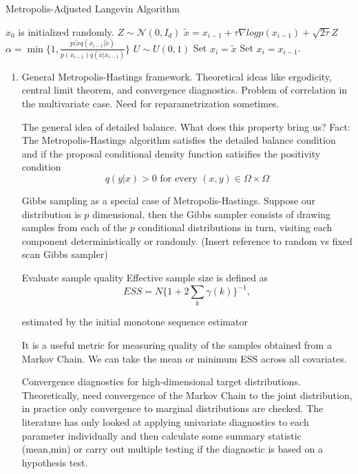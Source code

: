 \documentclass{book}
\begin{document}
\begin{algorithm}
\caption{Metropolis-Adjusted Langevin Algorithm}
\State $x_0$ is initialized randomly.
\State $Z \sim \mathcal{N}(0, I_d) $
\State $\tilde{x}= x_{i-1} + \tau \nabla log p(x_{i-1}) + \sqrt{2 \tau} Z$
\State $\alpha = \min\{1, \frac{p(\tilde{x} q(x_{i-1}|\tilde{x})}{p(x_{i-1})q(\tilde{x}|x_{i-1})}\} $
\State $U \sim U(0,1)$
 \State Set $x_i = \tilde{x}$
\Else{}
 \State Set $x_i = x_{i-1}$.
\EndIf
\EndFor
\EnfFunction
\end{algorithm}
\begin{enumerate} 


\item General Metropolis-Hastings framework. Theoretical ideas like ergodicity, central limit theorem, and convergence diagnostics. Problem of correlation in the multivariate case. Need for reparametrization sometimes.

The general idea of detailed balance. What does this property bring us? 
Fact:
The Metropolis-Hastings algorithm satisfies the detailed balance condition and
if the proposal conditional density function satisifies the positivity condition
\[ q(y|x) > 0 \text{ for every } (x,y) \in \Omega \times \Omega \]


Gibbs sampling as a special case of Metropolis-Hastings.
Suppose our distribution is $p$ dimensional, then the Gibbs sampler consists
of drawing samples from each of the $p$ conditional distributions in turn,
visiting each component deterministically or randomly. (Insert reference to
random vs fixed scan Gibbs sampler)

Evaluate sample quality
Effective sample size is defined as 
\[ ESS = N \{ 1 + 2 \sum_k \gamma(k) \}^{-1}, \]

estimated by the initial
monotone sequence estimator \cite{geyer1992practical}

It is a useful metric for measuring quality of the samples obtained from a
Markov Chain. We can take the mean or minimum ESS across all covariates.

Convergence diagnostics for high-dimensional target distributions. Theoretically, need convergence of the Markov Chain to the joint distribution, in practice only convergence to marginal distributions are checked. The literature has only looked at applying univariate diagnostics to each parameter individually and then calculate some summary statistic (mean,min) or carry out multiple testing if the diagnostic is based on a hypothesis test.


\end{enumerate}
\end{document}
